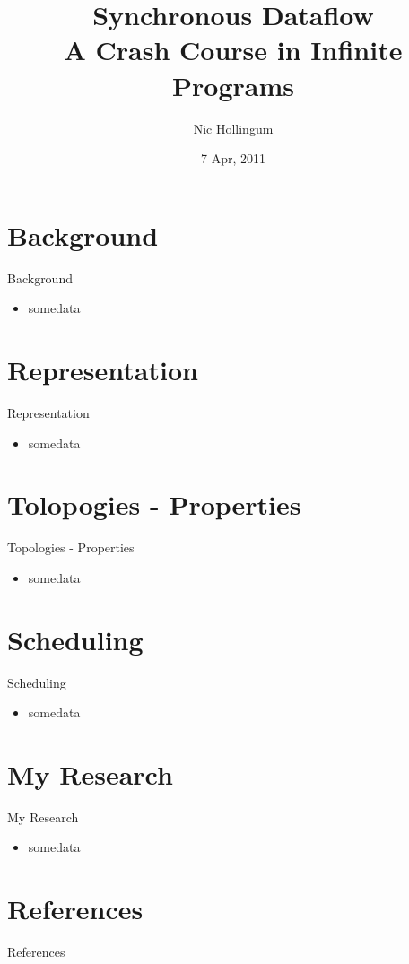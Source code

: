 \documentclass{beamer}
\title[SDF Crash Course]{Synchronous Dataflow\\A Crash Course in Infinite Programs}
\author{Nic Hollingum}
\institute{USYD}
\date{7 Apr, 2011}
\begin{document}
\begin{frame}
\titlepage
\end{frame}


\begin{frame}

\end{frame}

\section{Background}

\begin{frame}{Background}
\begin{itemize}
	\item somedata
\end{itemize}
\end{frame}

\section{Representation}

\begin{frame}{Representation}
\begin{itemize}
	\item somedata\cite{lee87}
\end{itemize}
\end{frame}

\section{Tolopogies - Properties}

\begin{frame}{Topologies - Properties}
\begin{itemize}
	\item somedata\cite{sdfBook, lee87}
\end{itemize}
\end{frame}

\section{Scheduling}

\begin{frame}{Scheduling}
\begin{itemize}
	\item somedata\cite{mal08}
\end{itemize}
\end{frame}

\section{My Research}

\begin{frame}{My Research}
\begin{itemize}
	\item somedata\cite{sih91, thi10}
\end{itemize}
\end{frame}

\section{References}
\begin{frame}[allowframebreaks]{References}


\end{frame}
\end{document}
